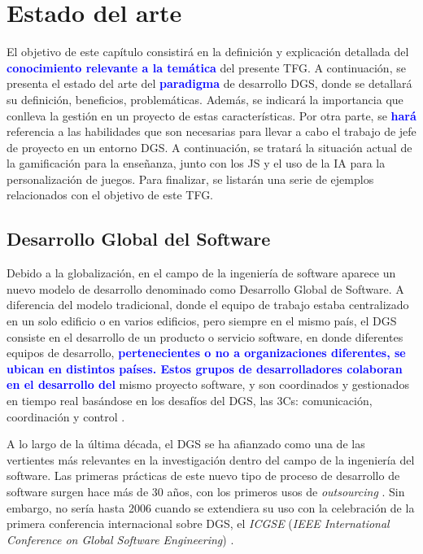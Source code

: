\chapter{Estado del arte}
\label{cap:Antecedentes}

El objetivo de este capítulo consistirá en la definición y explicación detallada del \textbf{\textcolor{blue}{conocimiento relevante a la temática}} del presente TFG. A continuación, se presenta el estado del arte del \textbf{\textcolor{blue}{paradigma}} de desarrollo DGS, donde se detallará su definición, beneficios, problemáticas. Además, se indicará la importancia que conlleva la gestión en un proyecto de estas características. Por otra parte, se \textbf{\textcolor{blue}{hará}} referencia a las habilidades que son necesarias para llevar a cabo el trabajo de jefe de proyecto en un entorno DGS. A continuación, se tratará la situación actual de la gamificación para la enseñanza, junto con los JS y el uso de la IA para la personalización de juegos. Para finalizar, se listarán una serie de ejemplos relacionados con el objetivo de este TFG.

\section{Desarrollo Global del Software}
\label{sec:DGS}

Debido a la globalización, en el campo de la ingeniería de software aparece un nuevo modelo de desarrollo denominado como Desarrollo Global de Software. A diferencia del modelo tradicional, donde el equipo de trabajo estaba centralizado en un solo edificio o en varios edificios, pero siempre en el mismo país, el DGS consiste en el desarrollo de un producto o servicio software, en donde diferentes equipos de desarrollo, \textbf{\textcolor{blue}{pertenecientes o no a organizaciones diferentes, se ubican en distintos países. Estos grupos de desarrolladores colaboran en el desarrollo del}} mismo proyecto software, y son coordinados y gestionados en tiempo real basándose en los desafíos del DGS, las 3Cs: comunicación, coordinación y control \cite{piattini2014desarrollo}.

A lo largo de la última década, el DGS se ha afianzado como una de las vertientes más relevantes en la investigación dentro del campo de la ingeniería del software. Las primeras prácticas de este nuevo tipo de proceso de desarrollo de software surgen hace más de 30 años, con los primeros usos de \emph{outsourcing} \cite{boehm2006view}. Sin embargo, no sería hasta 2006 cuando se extendiera su uso con la celebración de la primera conferencia internacional sobre DGS, el \emph{ICGSE} (\emph{IEEE International Conference on Global Software Engineering}) \cite{piattini2014desarrollo, vizcaino2015vision}.

